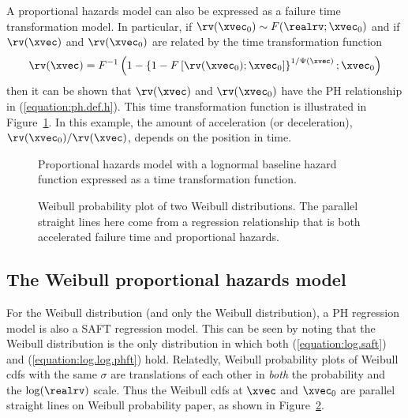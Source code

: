 A proportional hazards model can also be expressed as a failure time
transformation model. In particular, if $\rv(\xvec_{0}) \sim
F(\realrv;\xvec_{0})$ and if $\rv(\xvec)$ and $\rv(\xvec_{0})$ are
related by the time transformation function
\begin{equation}
\label{equation:ph.time.trans}
\rv(\xvec)=F^{-1}\left (
		1- \left \{ 			1 -F \left
[\rv(\xvec_{0});
\xvec_{0}
			         \right ] 		 \right
\}^{1/\Psi(\xvec)};
\xvec_{0}
			      \right )
\end{equation}
then it can be shown that $\rv(\xvec)$ and $\rv(\xvec_{0})$ have the
PH relationship in (\ref{equation:ph.def.h}).  This time
transformation function is illustrated in
Figure~\ref{figure:ph.transform.ps}.  In this example, the amount of
acceleration (or deceleration), $\rv(\xvec_{0})/\rv(\xvec)$, depends
on the position in time.

\begin{figure}
\caption{Proportional hazards model with a lognormal baseline
hazard function expressed as a time transformation function.}
\label{figure:ph.transform.ps}
\end{figure}

\begin{figure}
\caption{Weibull probability plot of
two Weibull distributions. The parallel straight lines
here come from a regression relationship that is both
accelerated failure time and proportional hazards.}
\label{figure:lawless.weib.ph.ps}
\end{figure}

\subsection{The Weibull proportional hazards model}
For the Weibull distribution (and only the Weibull distribution), a
PH regression model is also a SAFT regression model.  This can be
seen by noting that the Weibull distribution is the only
distribution in which both (\ref{equation:log.saft}) and
(\ref{equation:log.log.phft}) hold. Relatedly, Weibull probability
plots of Weibull cdfs with the same $\sigma$ are translations of each
other in {\em both} the probability and the $\log(\realrv)$
scale. Thus the Weibull cdfs at $\xvec$ and $\xvec_{0}$ are parallel
straight lines on Weibull probability paper, as shown in
Figure~\ref{figure:lawless.weib.ph.ps}.

